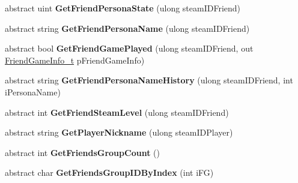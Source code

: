 \begin{DoxyCompactItemize}
abstract uint {\bfseries Get\+Friend\+Persona\+State} (ulong steam\+I\+D\+Friend)
\item 
\mbox{\label{class_valve_1_1_steamworks_1_1_i_steam_friends_ad194d0e173aaccf86d4a3059ddbf3b9d}} 
abstract string {\bfseries Get\+Friend\+Persona\+Name} (ulong steam\+I\+D\+Friend)
\item 
\mbox{\label{class_valve_1_1_steamworks_1_1_i_steam_friends_a6ab2e39e552ead3f95a09502389c8b9d}} 
abstract bool {\bfseries Get\+Friend\+Game\+Played} (ulong steam\+I\+D\+Friend, out \hyperlink{struct_valve_1_1_steamworks_1_1_friend_game_info__t}{Friend\+Game\+Info\+\_\+t} p\+Friend\+Game\+Info)
\item 
\mbox{\label{class_valve_1_1_steamworks_1_1_i_steam_friends_a064ae3683db4dad6aa940b5dda9efdfe}} 
abstract string {\bfseries Get\+Friend\+Persona\+Name\+History} (ulong steam\+I\+D\+Friend, int i\+Persona\+Name)
\item 
\mbox{\label{class_valve_1_1_steamworks_1_1_i_steam_friends_a048e7d076ba7cd4c5f2917f470c2da49}} 
abstract int {\bfseries Get\+Friend\+Steam\+Level} (ulong steam\+I\+D\+Friend)
\item 
\mbox{\label{class_valve_1_1_steamworks_1_1_i_steam_friends_a19e56a788782c878b22f23d646176b1c}} 
abstract string {\bfseries Get\+Player\+Nickname} (ulong steam\+I\+D\+Player)
\item 
\mbox{\label{class_valve_1_1_steamworks_1_1_i_steam_friends_a06524d45fe492be044c6a88c2d80f166}} 
abstract int {\bfseries Get\+Friends\+Group\+Count} ()
\item 
\mbox{\label{class_valve_1_1_steamworks_1_1_i_steam_friends_ad451350a60dc2b96a425f2fc03470a24}} 
abstract char {\bfseries Get\+Friends\+Group\+I\+D\+By\+Index} (int i\+FG)
\item 
\mbox{\label{class_valve_1_1_steamworks_1_1_i_steam_friends_aab112e9bb83d4f4e21d7a6546ce95b3b}} 

\end{DoxyCompactItemize}
